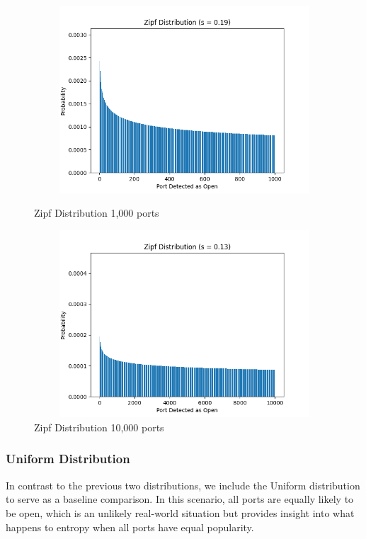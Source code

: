 \begin{figure}[h]
\begin{adjustwidth}{-2cm}{-1cm}
\centering
\begin{minipage}{.45\textwidth}
  \centering
\includegraphics[width=12cm, height=7cm, keepaspectratio]{entropy/img/zipf_distribution_1000.png}
    \caption{Zipf Distribution 1,000 ports}
    \label{fig:zipf_distribution_1000}
\end{minipage}
\hspace{2cm}
\begin{minipage}{.45\textwidth}
\includegraphics[width=12cm, height=7cm, keepaspectratio]{entropy/img/zipf_distribution_10000.png}
    \caption{Zipf Distribution 10,000 ports}
    \label{fig:zipf_distribution_10000}
\end{minipage}
\end{adjustwidth}
\end{figure}

\subsubsection{Uniform Distribution}

In contrast to the previous two distributions, we include the Uniform distribution to serve as a baseline comparison. In this scenario, all ports are equally likely to be open, which is an unlikely real-world situation but provides insight into what happens to entropy when all ports have equal popularity.

